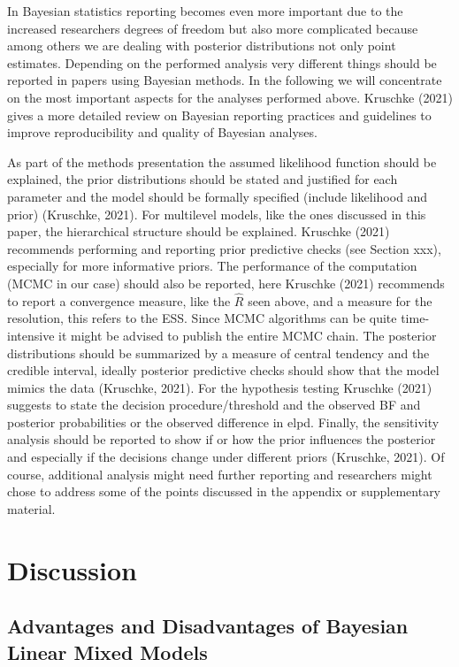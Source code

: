 \documentclass[
  doc,12pt,floatsintext]{apa7}
\begin{document}
In Bayesian statistics reporting becomes even more important due to the increased researchers degrees of freedom but also more complicated because among others we are dealing with posterior distributions not only point estimates. Depending on the performed analysis very different things should be reported in papers using Bayesian methods. In the following we will concentrate on the most important aspects for the analyses performed above. Kruschke (2021) gives a more detailed review on Bayesian reporting practices and guidelines to improve reproducibility and quality of Bayesian analyses.

As part of the methods presentation the assumed likelihood function should be explained, the prior distributions should be stated and justified for each parameter and the model should be formally specified (include likelihood and prior) (Kruschke, 2021). For multilevel models, like the ones discussed in this paper, the hierarchical structure should be explained. Kruschke (2021) recommends performing and reporting prior predictive checks (see Section xxx), especially for more informative priors. The performance of the computation (MCMC in our case) should also be reported, here Kruschke (2021) recommends to report a convergence measure, like the \(\hat{R}\) seen above, and a measure for the resolution, this refers to the ESS. Since MCMC algorithms can be quite time-intensive it might be advised to publish the entire MCMC chain. The posterior distributions should be summarized by a measure of central tendency and the credible interval, ideally posterior predictive checks should show that the model mimics the data (Kruschke, 2021). For the hypothesis testing Kruschke (2021) suggests to state the decision procedure/threshold and the observed BF and posterior probabilities or the observed difference in elpd. Finally, the sensitivity analysis should be reported to show if or how the prior influences the posterior and especially if the decisions change under different priors (Kruschke, 2021). Of course, additional analysis might need further reporting and researchers might chose to address some of the points discussed in the appendix or supplementary material.

\section{Discussion}\label{discussion}

\subsection{Advantages and Disadvantages of Bayesian Linear Mixed Models}\label{advantages-and-disadvantages-of-bayesian-linear-mixed-models}
\end{document}
